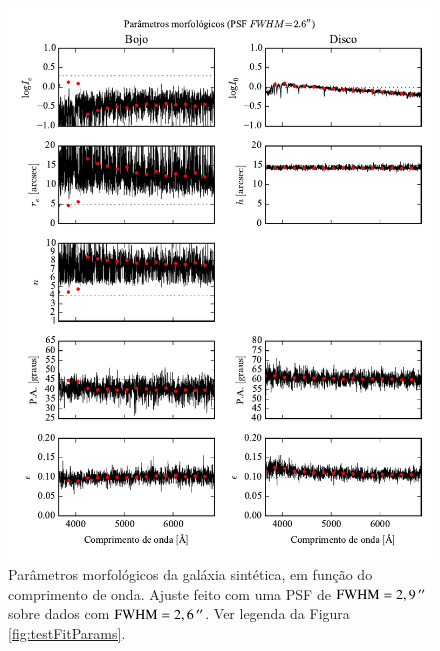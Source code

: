 \begin{figure}
	\includegraphics{figuras/simulation_fitparams_psf26}
	\caption[Parâmetros morfológicos (teste com PSF $\mathrm{FWHM} = 2,6\,\arcs$).]
	{Parâmetros morfológicos da galáxia sintética, em função do comprimento de
	onda. Ajuste feito com uma PSF de $\mathrm{FWHM} = 2,9\,^{\prime\prime}$ sobre
	dados com $\mathrm{FWHM} = 2,6\,\arcs$. Ver legenda da Figura
	\ref{fig:testFitParams}.}
	\label{fig:testFitParams26}
\end{figure}

